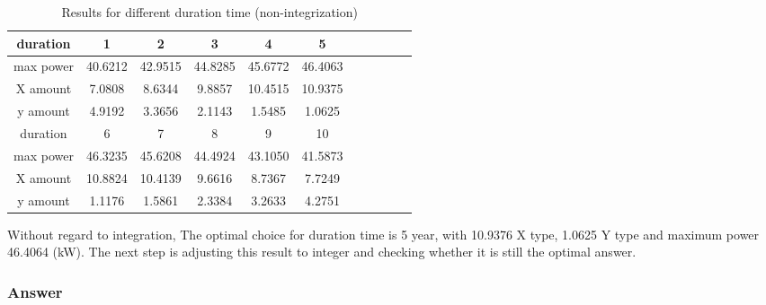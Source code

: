 \documentclass[titlepage,a4paper]{article}
\begin{document}
        \begin{table}

            \centering

            \caption{Results for different duration time (non-integrization)}
            \begin{tabular}{*{11}{c}}

                \toprule

                duration & 1 & 2 & 3 & 4 & 5  \\

                \midrule

                max power & 40.6212 & 42.9515  & 44.8285 & 45.6772 & 46.4063   \\

                X amount &  7.0808  & 8.6344  & 9.8857 & 10.4515 & 10.9375  \\

                y amount &   4.9192  &  3.3656  &  2.1143  &  1.5485  & 1.0625   \\

                \bottomrule

                \toprule

                duration  & 6 & 7 & 8 & 9 & 10 \\

                \midrule

                max power  & 46.3235 & 45.6208 & 44.4924 & 43.1050 & 41.5873 \\

                X amount  & 10.8824 & 10.4139 & 9.6616 & 8.7367 & 7.7249 \\

                y amount  & 1.1176 &  1.5861 & 2.3384 & 3.2633 & 4.2751 \\

                \bottomrule


            \end{tabular}
        \end{table}

        Without regard to integration, The optimal choice for duration time is 5 year, with 10.9376 X type, 1.0625 Y type and maximum power 46.4064 (kW). The next step is adjusting this result to integer and checking whether it is still the optimal answer.

        
        


        \subsubsection{Answer}



    
\end{document}
